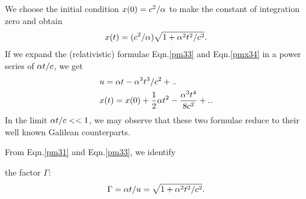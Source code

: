 We choose the initial condition $ x(0) =c^2/{\alpha}$ to 
make 
the constant of integration zero and obtain
\begin{align}\label{pmx34}
x(t)=(c^2/{\alpha})\sqrt{1+{\alpha}^2t^2/c^2}.
\end{align}
If we expand  the (relativistic) formulae 
Eqn.\eqref{pm33} 
and  Eqn.\eqref{pmx34} in a  power series of ${\alpha} 
t/c$, 
we get
\begin{align*}
&u ={\alpha} t -{\alpha}^3t^3/c^2+ ..  \\
&x(t) =x(0)+ \frac{1}{2}{\alpha} t^2
-\frac{{\alpha}^3t^4}{8c^2} +..
\end{align*}
In the limit ${\alpha} t/c << 1 $, we may observe that 
these two
formulae reduce to their well known {Galilean 
counterparts}.

From Eqn.\eqref{pm31} and Eqn.\eqref{pm33}, we identify 
 
the factor $\Gamma$:
\begin{align}\label{pm36}
\Gamma ={\alpha} t/u =\sqrt{1+{\alpha}^2t^2/c^2}.
\end{align}

